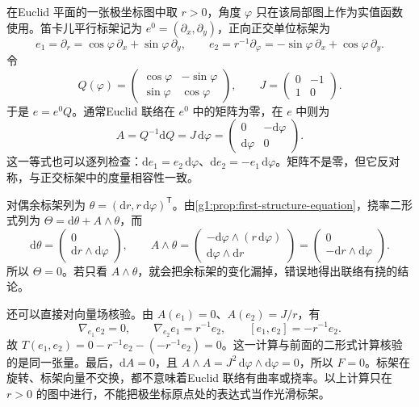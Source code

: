 \begin{example}\label{g1:exm:connection-check-polar}
	在Euclid 平面的一张极坐标图中取 \(r>0\)，角度 \(\varphi\) 只在该局部图上作为实值函数使用。笛卡儿平行标架记为 \(e^0=(\partial_x,\partial_y)\)，正向正交单位标架为
	\[
		e_1=\partial_r=\cos\varphi\,\partial_x+\sin\varphi\,\partial_y,\qquad
		e_2=r^{-1}\partial_\varphi=-\sin\varphi\,\partial_x+\cos\varphi\,\partial_y.
	\]
	令
	\[
		Q(\varphi)=
		\begin{pmatrix}\cos\varphi&-\sin\varphi\\
		\sin\varphi&\cos\varphi\end{pmatrix},
		\qquad
		J=\begin{pmatrix}0&-1\\1&0\end{pmatrix}.
	\]
	于是 \(e=e^0Q\)。通常Euclid 联络在 \(e^0\) 中的矩阵为零，在 \(e\) 中则为
	\[
		A=Q^{-1}\mathrm{d}Q=J\,\mathrm{d}\varphi
		=\begin{pmatrix}0&-\mathrm{d}\varphi\\
		\mathrm{d}\varphi&0\end{pmatrix}.
	\]
	这一等式也可以逐列检查：\(\mathrm{d}e_1=e_2\,\mathrm{d}\varphi\)、\(\mathrm{d}e_2=-e_1\,\mathrm{d}\varphi\)。矩阵不是零，但它反对称，与正交标架中的度量相容性一致。

	对偶余标架列为 \(\theta=(\mathrm{d}r,r\,\mathrm{d}\varphi)^{\mathsf T}\)。由\cref{g1:prop:first-structure-equation}，挠率二形式列为 \(\Theta=\mathrm{d}\theta+A\wedge\theta\)，而
	\[
		\mathrm{d}\theta=
		\begin{pmatrix}0\\\mathrm{d}r\wedge\mathrm{d}\varphi\end{pmatrix},
		\qquad
		A\wedge\theta=
		\begin{pmatrix}
			-\mathrm{d}\varphi\wedge(r\,\mathrm{d}\varphi)\\
			\mathrm{d}\varphi\wedge\mathrm{d}r
		\end{pmatrix}
		=\begin{pmatrix}0\\-\mathrm{d}r\wedge\mathrm{d}\varphi\end{pmatrix}.
	\]
	所以 \(\Theta=0\)。若只看 \(A\wedge\theta\)，就会把余标架的变化漏掉，错误地得出联络有挠的结论。

	还可以直接对向量场核验。由 \(A(e_1)=0\)、\(A(e_2)=J/r\)，有
	\[
		\nabla_{e_1}e_2=0,\qquad
		\nabla_{e_2}e_1=r^{-1}e_2,\qquad
		[e_1,e_2]=-r^{-1}e_2.
	\]
	故 \(T(e_1,e_2)=0-r^{-1}e_2-(-r^{-1}e_2)=0\)。这一计算与前面的二形式计算核验的是同一张量。最后，\(\mathrm{d}A=0\)，且 \(A\wedge A=J^2\,\mathrm{d}\varphi\wedge\mathrm{d}\varphi=0\)，所以 \(F=0\)。标架在旋转、标架向量不交换，都不意味着Euclid 联络有曲率或挠率。以上计算只在 \(r>0\) 的图中进行，不能把极坐标原点处的表达式当作光滑标架。
\end{example}

